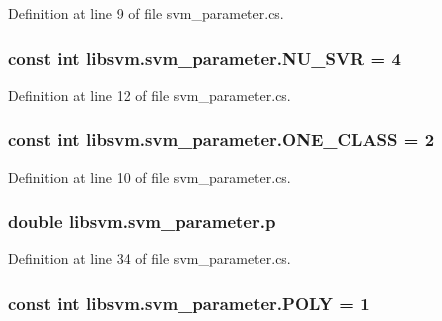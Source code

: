 Definition at line 9 of file svm\_\-parameter.cs.

\hypertarget{classlibsvm_1_1svm__parameter_a1c945358a3603fb7279b78f1afdde917}{
\subsubsection[{NU\_\-SVR}]{\setlength{\rightskip}{0pt plus 5cm}const int {\bf libsvm.svm\_\-parameter.NU\_\-SVR} = 4}}
\label{classlibsvm_1_1svm__parameter_a1c945358a3603fb7279b78f1afdde917}


Definition at line 12 of file svm\_\-parameter.cs.

\hypertarget{classlibsvm_1_1svm__parameter_a0eb39c0832cbb9b9b9a6f99943f4aa24}{
\subsubsection[{ONE\_\-CLASS}]{\setlength{\rightskip}{0pt plus 5cm}const int {\bf libsvm.svm\_\-parameter.ONE\_\-CLASS} = 2}}
\label{classlibsvm_1_1svm__parameter_a0eb39c0832cbb9b9b9a6f99943f4aa24}


Definition at line 10 of file svm\_\-parameter.cs.

\hypertarget{classlibsvm_1_1svm__parameter_a9d1eca9b49ac58736adb89d6c760f6ab}{
\subsubsection[{p}]{\setlength{\rightskip}{0pt plus 5cm}double {\bf libsvm.svm\_\-parameter.p}}}
\label{classlibsvm_1_1svm__parameter_a9d1eca9b49ac58736adb89d6c760f6ab}


Definition at line 34 of file svm\_\-parameter.cs.

\hypertarget{classlibsvm_1_1svm__parameter_acbee6b3c62134b0775ff51ceac95056b}{
\subsubsection[{POLY}]{\setlength{\rightskip}{0pt plus 5cm}const int {\bf libsvm.svm\_\-parameter.POLY} = 1}}
\label{classlibsvm_1_1svm__parameter_acbee6b3c62134b0775ff51ceac95056b}


